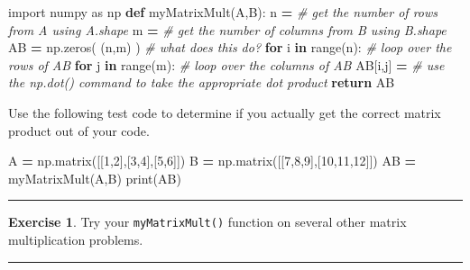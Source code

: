 \documentclass[
]{book}
\newenvironment{Shaded}{\begin{snugshade}}{\end{snugshade}}
\newcommand{\BuiltInTok}[1]{#1}
\newcommand{\CommentTok}[1]{\textcolor[rgb]{0.56,0.35,0.01}{\textit{#1}}}
\newcommand{\ControlFlowTok}[1]{\textcolor[rgb]{0.13,0.29,0.53}{\textbf{#1}}}
\newcommand{\DecValTok}[1]{\textcolor[rgb]{0.00,0.00,0.81}{#1}}
\newcommand{\ImportTok}[1]{#1}
\newcommand{\KeywordTok}[1]{\textcolor[rgb]{0.13,0.29,0.53}{\textbf{#1}}}
\newcommand{\NormalTok}[1]{#1}
\newcommand{\OperatorTok}[1]{\textcolor[rgb]{0.81,0.36,0.00}{\textbf{#1}}}
\theoremstyle{definition}
\theoremstyle{definition}
\theoremstyle{definition}
\newtheorem{exercise}{Exercise}[chapter]
\theoremstyle{remark}
\begin{document}
\begin{Shaded}
\begin{Highlighting}[]
\ImportTok{import}\NormalTok{ numpy }\ImportTok{as}\NormalTok{ np}
\KeywordTok{def}\NormalTok{ myMatrixMult(A,B):}
\NormalTok{    n }\OperatorTok{=} \CommentTok{\# get the number of rows from A using A.shape}
\NormalTok{    m }\OperatorTok{=} \CommentTok{\# get the number of columns from B using B.shape}
\NormalTok{    AB }\OperatorTok{=}\NormalTok{ np.zeros( (n,m) ) }\CommentTok{\# what does this do?}
    \ControlFlowTok{for}\NormalTok{ i }\KeywordTok{in} \BuiltInTok{range}\NormalTok{(n): }\CommentTok{\# loop over the rows of AB}
        \ControlFlowTok{for}\NormalTok{ j }\KeywordTok{in} \BuiltInTok{range}\NormalTok{(m): }\CommentTok{\# loop over the columns of AB}
\NormalTok{            AB[i,j] }\OperatorTok{=} \CommentTok{\# use the np.dot() command to take the appropriate dot product}
    \ControlFlowTok{return}\NormalTok{ AB}
\end{Highlighting}
\end{Shaded}

Use the following test code to determine if you actually get the correct matrix product out of your code.

\begin{Shaded}
\begin{Highlighting}[]
\NormalTok{A }\OperatorTok{=}\NormalTok{ np.matrix([[}\DecValTok{1}\NormalTok{,}\DecValTok{2}\NormalTok{],[}\DecValTok{3}\NormalTok{,}\DecValTok{4}\NormalTok{],[}\DecValTok{5}\NormalTok{,}\DecValTok{6}\NormalTok{]])}
\NormalTok{B }\OperatorTok{=}\NormalTok{ np.matrix([[}\DecValTok{7}\NormalTok{,}\DecValTok{8}\NormalTok{,}\DecValTok{9}\NormalTok{],[}\DecValTok{10}\NormalTok{,}\DecValTok{11}\NormalTok{,}\DecValTok{12}\NormalTok{]])}
\NormalTok{AB }\OperatorTok{=}\NormalTok{ myMatrixMult(A,B)}
\BuiltInTok{print}\NormalTok{(AB)}
\end{Highlighting}
\end{Shaded}

\begin{center}\rule{0.5\linewidth}{0.5pt}\end{center}

\begin{exercise}
\protect\hypertarget{exr:unnamed-chunk-305}{}{\label{exr:unnamed-chunk-305} }Try your \texttt{myMatrixMult()} function on several other matrix multiplication problems.
\end{exercise}

\begin{center}\rule{0.5\linewidth}{0.5pt}\end{center}
\end{document}
